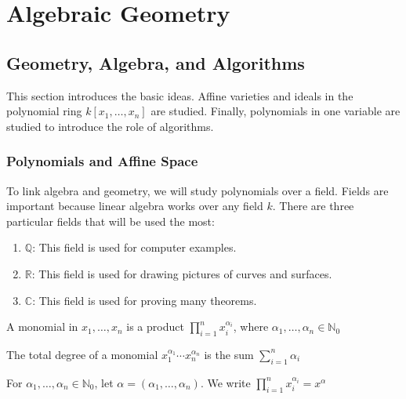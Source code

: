 \documentclass[crop=false,class=article,oneside]{standalone}
\begin{document}
    \ifx\ifmathcoursesalgebraicgeometry\undefined
        \section*{Algebraic Geometry}
        \setcounter{section}{1}
    \fi
    \subsection{Geometry, Algebra, and Algorithms}
        This section introduces the basic ideas. Affine
        varieties and ideals in the polynomial ring
        $k[x_1,\hdots,x_n]$ are studied. Finally, polynomials
        in one variable are studied to introduce the role
        of algorithms.
        \subsubsection{Polynomials and Affine Space}
            To link algebra and geometry, we will study
            polynomials over a field. Fields are important
            because linear algebra works over any field $k$.
            There are three particular fields that will
            be used the most:
            \begin{enumerate}
                \item $\mathbb{Q}$: This field is used
                      for computer examples.
                \item $\mathbb{R}$: This field is used
                      for drawing pictures of curves and surfaces.
                \item $\mathbb{C}$: This field is used
                      for proving many theorems.
            \end{enumerate}
            \begin{definition}
                A monomial in $x_1,\hdots,x_n$ is a product
                $\prod_{i=1}^{n}x_{i}^{\alpha_{i}}$, where
                $\alpha_{1},\hdots,\alpha_{n}\in\mathbb{N}_0$
            \end{definition}
            \begin{definition}
                The total degree of a monomial
                $x_1^{\alpha_1}\cdots x_n^{\alpha_n}$ is
                the sum $\sum_{i=1}^{n}\alpha_{i}$
            \end{definition}
            \begin{notation}
                For $\alpha_1,\hdots,\alpha_n\in\mathbb{N}_0$,
                let $\alpha=(\alpha_1,\hdots,\alpha_n)$.
                We write
                $\prod_{i=1}^{n}x_{i}^{\alpha_{i}}=x^{\alpha}$
            \end{notation}
\end{document}

